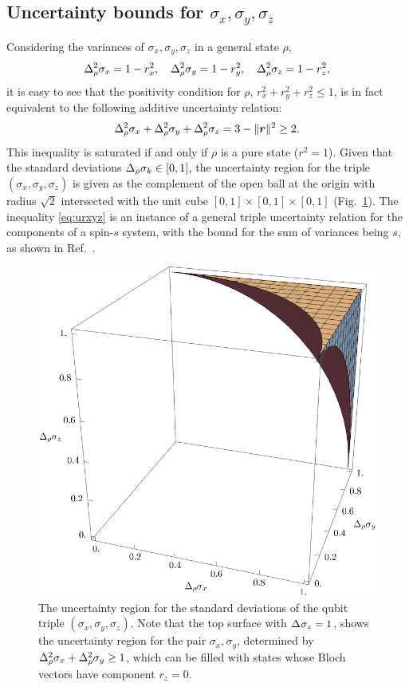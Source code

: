 \subsection{Uncertainty bounds for $\sigma_x,\sigma_y,\sigma_z$}\label{sec:xyz}
Considering the variances of $\sigma_x,\sigma_y,\sigma_z$ in a general state $\rho$,
\begin{equation}
  \varr{\sigma_x}=1-r_x^2,\quad \varr{\sigma_y}=1-r_y^2,  \quad \varr{\sigma_z}=1-r_z^2,
\end{equation}
it is easy to see that the positivity condition for $\rho$, $r_x^2+r_y^2+r_z^2\le 1$, is in fact equivalent to the following additive uncertainty relation:
\begin{align}\label{eq:urxyz}
  \varr{\sigma_x}+\varr{\sigma_y}+\varr{\sigma_z}=3-\|\bor\|^2\ge 2.
\end{align}
This inequality is saturated if and only if $\rho$ is a pure state ($r^2=1$).
Given that the standard deviations $\sdevr{\sigma_k}\in[0,1]$, the uncertainty region for the triple $(\sigma_x,\sigma_y,\sigma_z)$ is given as the complement of the open ball at the origin with radius $\sqrt{2}$ intersected with the unit cube $[0,1]\times[0,1]\times[0,1]$ (Fig.~\ref{fig:orth-triple}). The inequality \eqref{eq:urxyz} is an instance of a general triple uncertainty relation for the components of a spin-$s$ system, with the bound for the sum of variances being $s$, as shown in Ref.~\cite{HofmannTakeuchi2003}.

\begin{center}
  \begin{figure}[ht]
    \includegraphics[width=.5\textwidth]{figs/qubit-triple}
    \caption[The uncertainty region for the standard deviations of the qubit triple $(\sigma_x,\sigma_y,\sigma_z)$]{The uncertainty region for the standard deviations of the qubit triple $(\sigma_x,\sigma_y,\sigma_z)$. Note that the top surface with $\sdev{\sigma_z}=1$, shows the uncertainty region for the pair $\sigma_x,\sigma_y$, determined by
    $\varr{\sigma_x}+\varr{\sigma_y}\ge 1$, which can be filled with states whose Bloch vectors have component $r_z=0$.}
    \label{fig:orth-triple}
  \end{figure}
\end{center}

